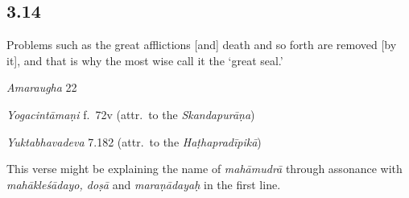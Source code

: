 \begin{ekdosis}
\subsection*{3.14}
\begin{translation}[hp03_014]
Problems such as the great afflictions [and] death and so forth are removed [by it], and that is why the most wise call it the `great seal.'
\end{translation}

\begin{sources}[hp03_014]
\emph{Amaraugha} 22
\begin{versinnote}
\tl{\var{mahākleśādayo doṣā ] mahārogā mahākleśā \vl}\\+}
\tl{\var{bhidyante ] jīryante \vl}\\!}
\end{versinnote}
\end{sources}

\begin{testimonia}[hp03_014]
\emph{Yogacintāmaṇi} f.~72v (attr.~to the \emph{Skandapurāṇa})
\begin{versinnote}
\end{versinnote}

\emph{Yuktabhavadeva} 7.182 (attr.~to the \emph{Haṭhapradīpikā})
\begin{versinnote}
\end{versinnote}
\end{testimonia}

\begin{philcomm}[hp03_014]
This verse might be explaining the name of \emph{mahāmudrā} through assonance with \emph{mahākleśādayo, doṣā} and \emph{maraṇādayaḥ} in the first line.
\end{philcomm}


\end{ekdosis}
